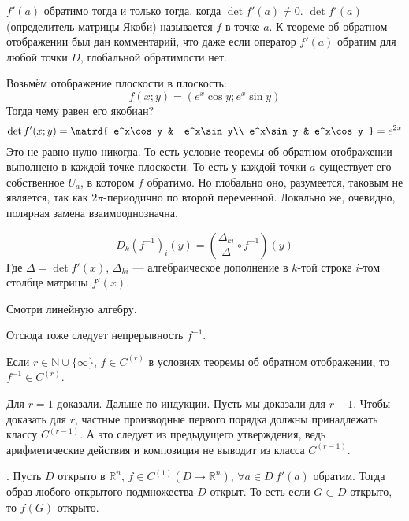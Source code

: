 \documentclass{article}
\begin{document}
\begin{itemize}
        \thm $f'(a)$ обратимо тогда и только тогда, когда $\det f'(a)\neq0$.
        \dfn $\det f'(a)$ (определитель матрицы Якоби) называется  $f$ в точке $a$.
        \thm К теореме об обратном отображении был дан комментарий, что даже если оператор $f'(a)$ обратим для любой точки $D$, глобальной обратимости нет.
        \begin{Example}
            Возьмём отображение плоскости в плоскость:
            $$
            f(x;y)=(e^x\cos y;e^x\sin y)
            $$
            Тогда чему равен его якобиан?
            $$
            \det f'(x;y)=\matrd{
                e^x\cos y & -e^x\sin y\\
                e^x\sin y & e^x\cos y
            }=e^{2x}
            $$
            Это не равно нулю никогда. То есть условие теоремы об обратном отображении выполнено в каждой точке плоскости. То есть у каждой точки $a$ существует его собственное $U_a$, в котором $f$ обратимо. Но глобально оно, разумеется, таковым не является, так как $2\pi$-периодично по второй переменной. Локально же, очевидно, полярная замена взаимооднозначна.
        \end{Example}
        \thm
        $$
        D_k(f^{-1})_i(y)=\left(\frac{\Delta_{ki}}{\Delta}\circ f^{-1}\right)(y)
        $$
        Где $\Delta=\det f'(x)$, $\Delta_{ki}$ --- алгебраическое дополнение в $k$-той строке $i$-том столбце матрицы $f'(x)$.
        \begin{Proof}
            Смотри линейную алгебру.
        \end{Proof}
        \begin{Comment}
            Отсюда тоже следует непрерывность $f^{-1}$.
        \end{Comment}
        \thm Если $r\in\mathbb N\cup\{\infty\}$, $f\in C^{(r)}$ в условиях теоремы об обратном отображении, то $f^{-1}\in C^{(r)}$.
        \begin{Proof}
            Для $r=1$ доказали. Дальше по индукции. Пусть мы доказали для $r-1$. Чтобы доказать для $r$, частные производные первого порядка должны принадлежать классу $C^{(r-1)}$. А это следует из предыдущего утверждения, ведь арифметические действия и композиция не выводит из класса $C^{(r-1)}$.
        \end{Proof}
        \thm {}. Пусть $D$ открыто в $\mathbb R^n$, $f\in C^{(1)}(D\to\mathbb R^n)$, $\forall a\in D~f'(a)$ обратим. Тогда образ любого открытого подмножества $D$ открыт. То есть если $G\subset D$ открыто, то $f(G)$ открыто.

\end{itemize}
\end{document}
